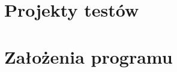 \documentclass{article}
\begin{document}
	\section{Projekty testów}
	\section{Założenia programu}
	
	

 


\end{document}
